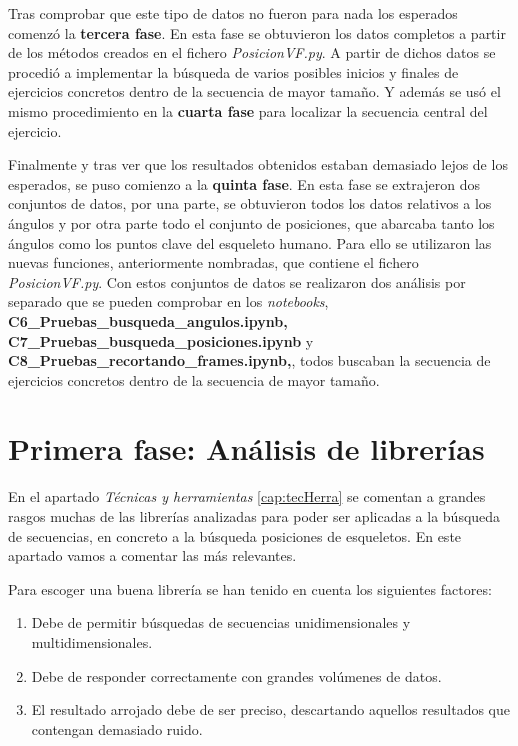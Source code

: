Tras comprobar que este tipo de datos no fueron para nada los esperados comenzó la \textbf{tercera fase}. En esta fase se obtuvieron los datos completos a partir de los métodos creados en el fichero \textit{PosicionVF.py}. A partir de dichos datos se procedió a implementar  la búsqueda de varios posibles inicios y finales de ejercicios concretos dentro de la secuencia de mayor tamaño. Y además se usó el mismo procedimiento en la \textbf{cuarta fase} para localizar la secuencia central del ejercicio.

Finalmente y tras ver que los resultados obtenidos estaban demasiado lejos de los esperados, se puso comienzo a la \textbf{quinta fase}. En esta fase se extrajeron dos conjuntos de datos, por una parte, se obtuvieron todos los datos relativos a los ángulos y por otra parte todo el conjunto de posiciones, que abarcaba tanto los ángulos como los puntos clave del esqueleto humano. Para ello se utilizaron las nuevas funciones, anteriormente nombradas, que contiene el fichero \textit{PosicionVF.py}. Con estos conjuntos de datos se realizaron dos análisis por separado que se pueden comprobar en los \textit{notebooks},  \textbf{C6\_Pruebas\_busqueda\_angulos.ipynb, C7\_Pruebas\_busqueda\_posiciones.ipynb} y \\ \textbf{C8\_Pruebas\_recortando\_frames.ipynb,}, todos buscaban la secuencia de ejercicios concretos dentro de la secuencia de mayor tamaño. 


\section{Primera fase: Análisis de librerías}

En el apartado \textit{Técnicas y herramientas} \ref{cap:tecHerra} se comentan a grandes rasgos muchas de las librerías analizadas para poder ser aplicadas a la búsqueda de secuencias, en concreto a la búsqueda posiciones de esqueletos. En este apartado vamos a comentar las más relevantes.

Para escoger una buena librería se han tenido en cuenta los siguientes factores:
\begin{enumerate}
    \item Debe de permitir búsquedas de secuencias unidimensionales y multidimensionales.
    \item Debe de responder correctamente con grandes volúmenes de datos.
    \item El resultado arrojado debe de ser preciso, descartando aquellos resultados que contengan demasiado ruido.
    
\end{enumerate}

